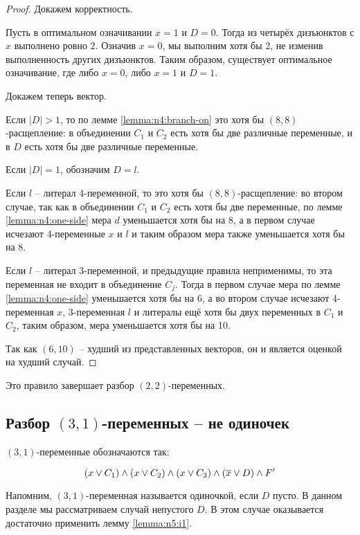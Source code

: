 \begin{proof}
 Докажем корректность.

 Пусть в оптимальном означивании $x = 1$ и $D = 0$. Тогда из четырёх дизъюнктов с $x$ выполнено ровно 2. Означив $x = 0$, мы выполним хотя бы 2, не изменив выполненность других дизъюнктов. Таким образом, существует оптимальное означивание, где либо $x = 0$, либо $x = 1$ и $D = 1$.

 Докажем теперь вектор.

 Если $|D| > 1$, то по лемме \ref{lemma:n4:branch-on} это хотя бы $(8,8)$-расщепление: в объединении $C_1$ и $C_2$ есть хотя бы две различные переменные, и в $D$ есть хотя бы две различные переменные.

 Если $|D| = 1$, обозначим $D = l$.

 Если $l$ -- литерал 4-переменной, то это хотя бы $(8,8)$-расщепление: во втором случае, так как в объединении $C_1$ и $C_2$ есть хотя бы две переменные, по лемме \ref{lemma:n4:one-side} мера $d$ уменьшается хотя бы на 8, а в первом случае исчезают 4-переменные $x$ и $l$ и таким образом мера также уменьшается хотя бы на 8.

 Если $l$ -- литерал 3-переменной, и предыдущие правила неприменимы, то эта переменная не входит в объединение $C_j$. Тогда в первом случае мера по лемме \ref{lemma:n4:one-side} уменьшается хотя бы на 6, а во втором случае исчезают 4-переменная $x$, 3-переменная $l$ и литералы ещё хотя бы двух переменных в $C_1$ и $C_2$, таким образом, мера уменьшается хотя бы на 10.

 Так как $(6,10)$ -- худший из представленных векторов, он и является оценкой на худший случай.
\end{proof}

Это правило завершает разбор $(2,2)$-переменных.

\subsection{Разбор $(3,1)$-переменных -- не одиночек}
\label{subsec:n4:31-ns}

$(3,1)$-переменные обозначаются так:

$$
 (x \vee C_1) \wedge (x \vee C_2) \wedge (x \vee C_3) \wedge (\overline{x} \vee D) \wedge F'
$$

Напомним, $(3,1)$-переменная называется одиночкой, если $D$ пусто.
В данном разделе мы рассматриваем случай непустого $D$.
В этом случае оказывается достаточно применить лемму \ref{lemma:n5:i1}.

